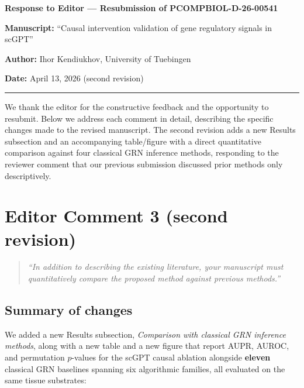 \documentclass[11pt,letterpaper]{article}
\begin{document}
\begin{flushleft}
{\Large\bfseries Response to Editor --- Resubmission of PCOMPBIOL-D-26-00541}

\bigskip

\textbf{Manuscript:} ``Causal intervention validation of gene regulatory
signals in scGPT''

\textbf{Author:} Ihor Kendiukhov, University of Tuebingen

\textbf{Date:} April 13, 2026 (second revision)
\end{flushleft}

\bigskip
\noindent\rule{\textwidth}{0.4pt}
\bigskip

\noindent We thank the editor for the constructive feedback and the
opportunity to resubmit. Below we address each comment in detail,
describing the specific changes made to the revised manuscript. The second
revision adds a new Results subsection and an accompanying table/figure
with a direct quantitative comparison against four classical GRN inference
methods, responding to the reviewer comment that our previous submission
discussed prior methods only descriptively.

\bigskip

\section*{Editor Comment 3 (second revision)}

\begin{quote}
\textit{``In addition to describing the existing literature, your
manuscript must quantitatively compare the proposed method against
previous methods.''}
\end{quote}

\subsection*{Summary of changes}

We added a new Results subsection, \textit{Comparison with classical GRN
inference methods}, along with a new table and a new figure that report
AUPR, AUROC, and permutation $p$-values for the scGPT causal ablation
alongside \textbf{eleven} classical GRN baselines spanning six algorithmic
families, all evaluated on the same tissue substrates:
\end{document}
